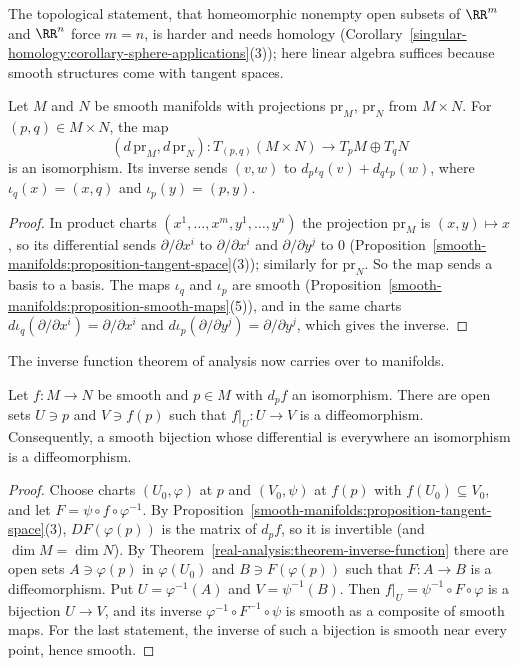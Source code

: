 The topological statement, that homeomorphic nonempty open subsets of $\RR^m$ and $\RR^n$ force $m = n$, is harder and needs homology
(Corollary~\ref{singular-homology:corollary-sphere-applications}(3)); here linear algebra suffices because smooth structures come with tangent spaces.

\begin{proposition}\label{smooth-manifolds:proposition-product-tangent}
Let $M$ and $N$ be smooth manifolds with projections $\mathrm{pr}_M$, $\mathrm{pr}_N$ from $M \times N$. For $(p, q) \in M \times N$, the map
\[
(d\,\mathrm{pr}_M, d\,\mathrm{pr}_N) \colon T_{(p,q)}(M \times N) \to T_pM \oplus T_qN
\]
is an isomorphism. Its inverse sends $(v, w)$ to $d_p\iota_q(v) + d_q\iota_p(w)$, where $\iota_q(x) = (x, q)$ and $\iota_p(y) = (p, y)$.
\end{proposition}

\begin{proof}
In product charts $(x^1, \ldots, x^m, y^1, \ldots, y^n)$ the projection $\mathrm{pr}_M$ is $(x, y) \mapsto x$, so its differential sends
$\partial/\partial x^i$ to $\partial/\partial x^i$ and $\partial/\partial y^j$ to $0$ (Proposition~\ref{smooth-manifolds:proposition-tangent-space}(3)); similarly
for $\mathrm{pr}_N$. So the map sends a basis to a basis. The maps $\iota_q$ and $\iota_p$ are smooth (Proposition~\ref{smooth-manifolds:proposition-smooth-maps}(5)),
and in the same charts $d\iota_q(\partial/\partial x^i) = \partial/\partial x^i$ and $d\iota_p(\partial/\partial y^j) = \partial/\partial y^j$, which gives the
inverse.
\end{proof}

The inverse function theorem of analysis now carries over to manifolds.

\begin{theorem}\label{smooth-manifolds:theorem-inverse-function-manifolds}
Let $f \colon M \to N$ be smooth and $p \in M$ with $d_pf$ an isomorphism. There are open sets $U \ni p$ and $V \ni f(p)$ such that $f|_U \colon U \to V$ is a
diffeomorphism. Consequently, a smooth bijection whose differential is everywhere an isomorphism is a diffeomorphism.
\end{theorem}

\begin{proof}
Choose charts $(U_0, \varphi)$ at $p$ and $(V_0, \psi)$ at $f(p)$ with $f(U_0) \subseteq V_0$, and let $F = \psi \circ f \circ \varphi^{-1}$. By
Proposition~\ref{smooth-manifolds:proposition-tangent-space}(3), $DF(\varphi(p))$ is the matrix of $d_pf$, so it is invertible (and $\dim M = \dim N$). By
Theorem~\ref{real-analysis:theorem-inverse-function} there are open sets $A \ni \varphi(p)$ in $\varphi(U_0)$ and $B \ni F(\varphi(p))$ such that
$F \colon A \to B$ is a diffeomorphism. Put $U = \varphi^{-1}(A)$ and $V = \psi^{-1}(B)$. Then $f|_U = \psi^{-1} \circ F \circ \varphi$ is a bijection $U \to V$,
and its inverse $\varphi^{-1} \circ F^{-1} \circ \psi$ is smooth as a composite of smooth maps. For the last statement, the inverse of such a bijection is
smooth near every point, hence smooth.
\end{proof}

